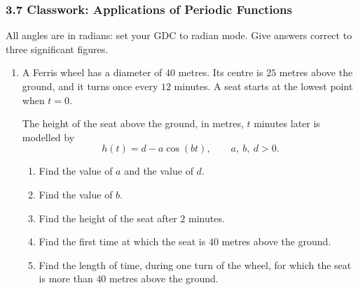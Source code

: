 \documentclass[12pt, twoside]{article}
\begin{document}
\subsubsection*{3.7 Classwork: Applications of Periodic Functions}

All angles are in radians: set your GDC to radian mode. Give answers
correct to three significant figures.

\begin{enumerate}[itemsep=0.15cm]

\item[1.]
\begin{minipage}[t]{0.6\linewidth}
A Ferris wheel has a diameter of $40$ metres. Its centre is $25$ metres
above the ground, and it turns once every $12$ minutes. A seat starts at
the lowest point when $t = 0$.

\smallskip
The height of the seat above the ground, in metres, $t$ minutes later is
modelled by
\[
h(t) = d - a\cos(bt), \qquad a,\ b,\ d > 0.
\]
\end{minipage}%
\begin{minipage}[t]{0.4\linewidth}
\vspace{0pt}
\begin{flushright}
\end{flushright}
\end{minipage}

\begin{enumerate}[itemsep=0.1cm]
  \item Find the value of $a$ and the value of $d$.
  \item Find the value of $b$.
  \item Find the height of the seat after $2$ minutes.
  \item Find the first time at which the seat is $40$ metres above the
  ground.
  \item Find the length of time, during one turn of the wheel, for which the
  seat is more than $40$ metres above the ground.
\end{enumerate}


\end{enumerate}
\end{document}
